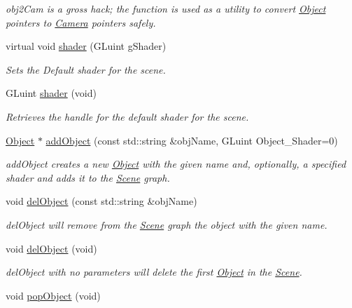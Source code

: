 \begin{DoxyCompactItemize}
\begin{DoxyCompactList}\small\item\em obj2\-Cam is a gross hack; the function is used as a utility to convert \hyperlink{class_object}{Object} pointers to \hyperlink{class_camera}{Camera} pointers safely. \end{DoxyCompactList}\item 
virtual void \hyperlink{class_scene_a3ea7e92935755c776c235a9872f53394}{shader} (G\-Luint g\-Shader)
\begin{DoxyCompactList}\small\item\em Sets the Default shader for the scene. \end{DoxyCompactList}\item 
G\-Luint \hyperlink{class_scene_a9d8a33f0f0a296aba0fb6717ab85cb18}{shader} (void)
\begin{DoxyCompactList}\small\item\em Retrieves the handle for the default shader for the scene. \end{DoxyCompactList}\item 
\hyperlink{class_object}{Object} $\ast$ \hyperlink{class_scene_aa5a48614e959c38c35d824fa9d6a4b8b}{add\-Object} (const std\-::string \&obj\-Name, G\-Luint Object\-\_\-\-Shader=0)
\begin{DoxyCompactList}\small\item\em add\-Object creates a new \hyperlink{class_object}{Object} with the given name and, optionally, a specified shader and adds it to the \hyperlink{class_scene}{Scene} graph. \end{DoxyCompactList}\item 
void \hyperlink{class_scene_a2a6845dacbb468c5c097c7a6ab5a0fe0}{del\-Object} (const std\-::string \&obj\-Name)
\begin{DoxyCompactList}\small\item\em del\-Object will remove from the \hyperlink{class_scene}{Scene} graph the object with the given name. \end{DoxyCompactList}\item 
\hypertarget{class_scene_a2e6b319b60e27e66ad43bb942a6c4424}{void \hyperlink{class_scene_a2e6b319b60e27e66ad43bb942a6c4424}{del\-Object} (void)}\label{class_scene_a2e6b319b60e27e66ad43bb942a6c4424}

\begin{DoxyCompactList}\small\item\em del\-Object with no parameters will delete the first \hyperlink{class_object}{Object} in the \hyperlink{class_scene}{Scene}. \end{DoxyCompactList}\item 
\hypertarget{class_scene_ad6c9d1d1d0c786d39bf97dc60410e28b}{void \hyperlink{class_scene_ad6c9d1d1d0c786d39bf97dc60410e28b}{pop\-Object} (void)}\label{class_scene_ad6c9d1d1d0c786d39bf97dc60410e28b}


\end{DoxyCompactItemize}
